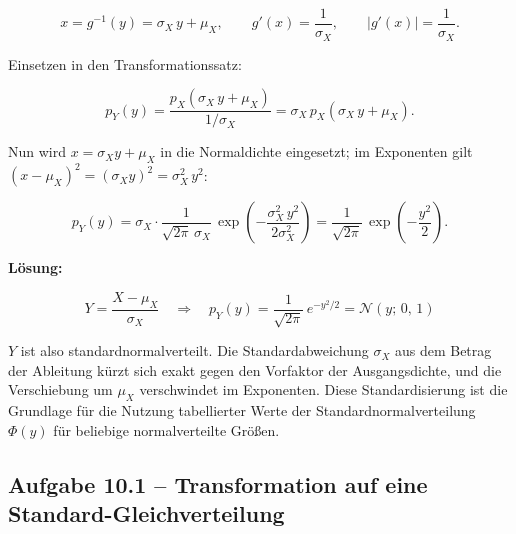 \begin{beispiel}
$$
x = g^{-1}(y) = \sigma_X\, y + \mu_X, \qquad
g'(x) = \frac{1}{\sigma_X}, \qquad |g'(x)| = \frac{1}{\sigma_X}.
$$

Einsetzen in den Transformationssatz:

$$
p_Y(y) = \frac{p_X\!\left(\sigma_X\, y + \mu_X\right)}{1/\sigma_X}
       = \sigma_X\, p_X\!\left(\sigma_X\, y + \mu_X\right).
$$

Nun wird $x = \sigma_X y + \mu_X$ in die Normaldichte eingesetzt; im Exponenten
gilt $(x - \mu_X)^2 = (\sigma_X y)^2 = \sigma_X^2\, y^2$:

$$
p_Y(y) = \sigma_X \cdot \frac{1}{\sqrt{2\pi}\,\sigma_X}\,
         \exp\!\left(-\frac{\sigma_X^2\, y^2}{2\sigma_X^2}\right)
       = \frac{1}{\sqrt{2\pi}}\, \exp\!\left(-\frac{y^2}{2}\right).
$$

\textbf{Lösung:}

$$
\boxed{\;Y = \frac{X - \mu_X}{\sigma_X}
\quad\Longrightarrow\quad
p_Y(y) = \frac{1}{\sqrt{2\pi}}\, e^{-y^2/2}
= \mathcal{N}(y;\, 0,\, 1)\;}
$$

$Y$ ist also standardnormalverteilt. Die Standardabweichung $\sigma_X$ aus dem
Betrag der Ableitung kürzt sich exakt gegen den Vorfaktor der Ausgangsdichte,
und die Verschiebung um $\mu_X$ verschwindet im Exponenten. Diese
Standardisierung ist die Grundlage für die Nutzung tabellierter Werte der
Standardnormalverteilung $\Phi(y)$ für beliebige normalverteilte Größen.

\end{beispiel}

\subsection*{Aufgabe 10.1 – Transformation auf eine Standard-Gleichverteilung}

